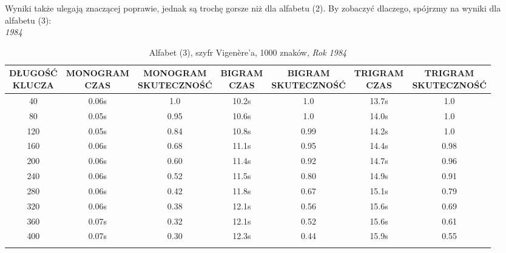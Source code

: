 \documentclass[a4paper]{article}
\theoremstyle{defn}
\theoremstyle{theorem}
\theoremstyle{lemma}
\theoremstyle{cor}
\theoremstyle{fact}
\begin{document}
Wyniki także ulegają znaczącej poprawie, jednak są trochę gorsze niż dla alfabetu (2). By zobaczyć dlaczego, spójrzmy na wyniki dla alfabetu (3):\\
\textit{1984}
\begin{center}\begin{small}\begin{longtable}{|c|c|c|c|c|c|c|}
\hline \makecell{DŁUGOŚĆ\\KLUCZA} &  \makecell{MONOGRAM\\CZAS} & \makecell{MONOGRAM\\SKUTECZNOŚĆ} & \makecell{BIGRAM\\CZAS} &  \makecell{BIGRAM\\SKUTECZNOŚĆ} & \makecell{TRIGRAM\\CZAS} & \makecell{TRIGRAM\\SKUTECZNOŚĆ}\\ \hline
40 & 0.06s & 1.0 & 10.2s & 1.0 & 13.7s & 1.0 \\ \hline
80 & 0.05s & 0.95 & 10.6s & 1.0 & 14.0s & 1.0 \\ \hline
120 & 0.05s & 0.84 & 10.8s & 0.99 & 14.2s & 1.0 \\ \hline
160 & 0.06s & 0.68 & 11.1s & 0.95 & 14.4s & 0.98 \\ \hline
200 & 0.06s & 0.60 & 11.4s & 0.92 & 14.7s & 0.96 \\ \hline
240 & 0.06s & 0.52 & 11.5s & 0.80 & 14.9s & 0.91 \\ \hline
280 & 0.06s & 0.42 & 11.8s & 0.67 & 15.1s & 0.79 \\ \hline
320 & 0.06s & 0.38 & 12.1s & 0.56 & 15.6s & 0.69 \\ \hline
360 & 0.07s & 0.32 & 12.1s & 0.52 & 15.6s & 0.61 \\ \hline
400 & 0.07s & 0.30 & 12.3s & 0.44 & 15.9s & 0.55 \\ \hline
\caption{Alfabet (3), szyfr Vigenère'a, 1000 znaków, \textit{Rok 1984}}
\end{longtable}\end{small}\end{center}
\end{document}
